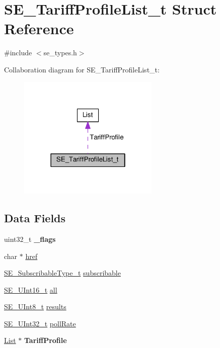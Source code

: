\hypertarget{structSE__TariffProfileList__t}{}\section{S\+E\+\_\+\+Tariff\+Profile\+List\+\_\+t Struct Reference}
\label{structSE__TariffProfileList__t}


{\ttfamily \#include $<$se\+\_\+types.\+h$>$}



Collaboration diagram for S\+E\+\_\+\+Tariff\+Profile\+List\+\_\+t\+:\nopagebreak
\begin{figure}[H]
\begin{center}
\leavevmode
\includegraphics[width=190pt]{structSE__TariffProfileList__t__coll__graph}
\end{center}
\end{figure}
\subsection*{Data Fields}
\begin{DoxyCompactItemize}
\item 
uint32\+\_\+t {\bfseries \+\_\+flags}
\item 
char $\ast$ \hyperlink{group__TariffProfileList_ga4bb7a09526e0326e0467e6964ffc5836}{href}
\item 
\hyperlink{group__SubscribableType_ga5c41f553d369710ed34619266bf2551e}{S\+E\+\_\+\+Subscribable\+Type\+\_\+t} \hyperlink{group__TariffProfileList_gaa153bac887e9928acdfee8db13723c96}{subscribable}
\item 
\hyperlink{group__UInt16_gac68d541f189538bfd30cfaa712d20d29}{S\+E\+\_\+\+U\+Int16\+\_\+t} \hyperlink{group__TariffProfileList_gad7821bca59072f3810fd844e6081b99f}{all}
\item 
\hyperlink{group__UInt8_gaf7c365a1acfe204e3a67c16ed44572f5}{S\+E\+\_\+\+U\+Int8\+\_\+t} \hyperlink{group__TariffProfileList_ga7865e883422f7ffd3ce157762c025a94}{results}
\item 
\hyperlink{group__UInt32_ga70bd4ecda3c0c85d20779d685a270cdb}{S\+E\+\_\+\+U\+Int32\+\_\+t} \hyperlink{group__TariffProfileList_gad9e0c75fafd8450f4d505c965c3a889d}{poll\+Rate}
\item 
\hyperlink{structList}{List} $\ast$ {\bfseries Tariff\+Profile}
\end{DoxyCompactItemize}


